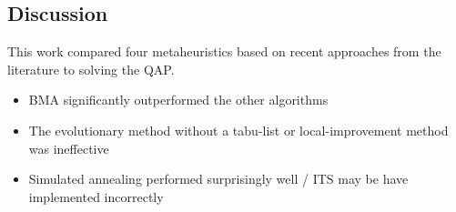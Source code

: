 \subsection{Discussion} {
    This work compared four metaheuristics based on recent approaches from the literature to solving the QAP.

    \begin{itemize}
        \item BMA significantly outperformed the other algorithms
        \item The evolutionary method without a tabu-list or local-improvement method was ineffective
        \item Simulated annealing performed surprisingly well / ITS may be have implemented incorrectly
    \end{itemize}

}
